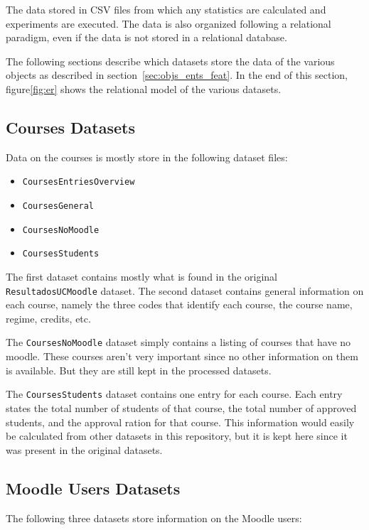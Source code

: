 The data stored in CSV files from which any statistics are calculated and
experiments are executed. The data is also organized following a relational
paradigm, even if the data is not stored in a relational database.

The following sections describe which datasets store the data of the various
objects as described in section~\ref{sec:objs_ents_feat}. In the end of this
section, figure\ref{fig:er} shows the relational model of the various datasets.

\subsection{Courses Datasets}

Data on the courses is mostly store in the following dataset files:

\begin{itemize}
    \item \texttt{CoursesEntriesOverview}
    \item \texttt{CoursesGeneral}
    \item \texttt{CoursesNoMoodle}
    \item \texttt{CoursesStudents}
\end{itemize}

The first dataset contains mostly what is found in the original
\texttt{ResultadosUCMoodle} dataset. The second dataset contains general
information on each course, namely the three codes that identify each course,
the course name, regime, credits, etc.

The \texttt{CoursesNoMoodle} dataset simply contains a listing of courses that
have no moodle. These courses aren't very important since no other information
on them is available. But they are still kept in the processed datasets.

The \texttt{CoursesStudents} dataset contains one entry for each course. Each
entry states the total number of students of that course, the total number of
approved students, and the approval ration for that course. This information
would easily be calculated from other datasets in this repository, but it is
kept here since it was present in the original datasets.

\subsection{Moodle Users Datasets}

The following three datasets store information on the Moodle users:

